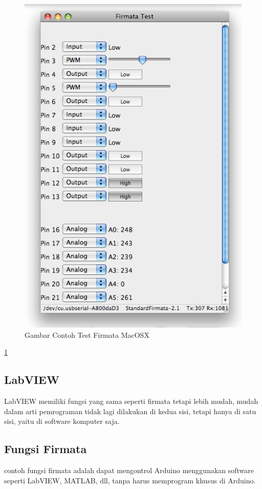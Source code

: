 	\begin{figure} [ht]
		\centerline{\includegraphics[width=1\textwidth]{figures/firmatates.png}}
		\caption{Gambar Contoh Test Firmata MacOSX}
		\label{firmatates}
	\end{figure}
	
	\ref{firmatates}
	
	
	\subsection{LabVIEW}
	LabVIEW memiliki fungsi yang sama seperti firmata tetapi lebih mudah, mudah dalam arti pemrograman tidak lagi dilakukan di kedua sisi,
	tetapi hanya di satu sisi, yaitu di software komputer saja.
	
	\subsection{Fungsi Firmata}
	contoh fungsi firmata adalah dapat mengontrol Arduino menggunakan software seperti LabVIEW, MATLAB, dll, tanpa harus memprogram khusus di Arduino.
	
